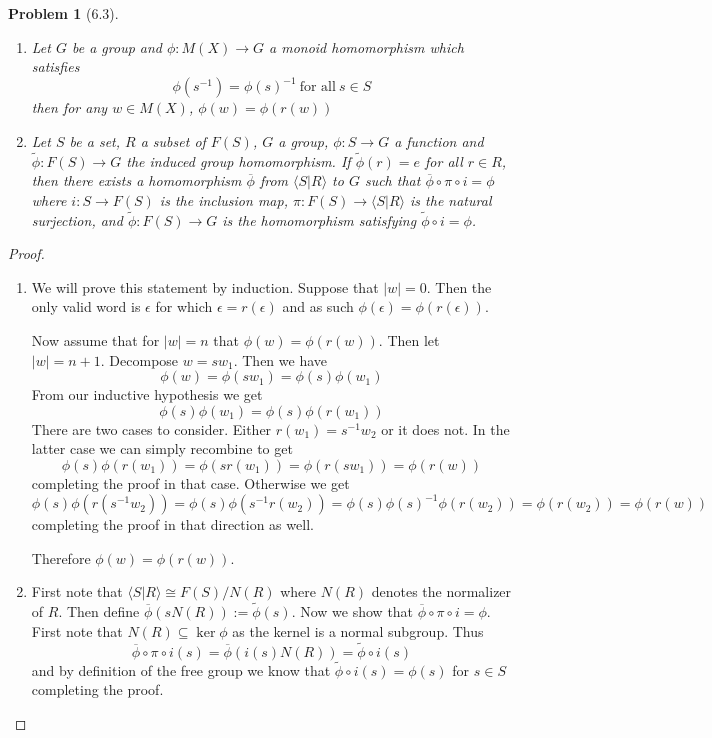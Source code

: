 \documentclass[10pt]{article}
\theoremstyle{plain}
\newtheorem{problem}{Problem}
\theoremstyle{remark}
\begin{document}
\begin{problem}[6.3]
  \begin{enumerate}
  \item Let $G$ be a group and $\phi:M(X)\rightarrow G$ a monoid homomorphism which
    satisfies
    \[ \phi(s^{-1})=\phi(s)^{-1}\ \text{for all}\ s\in S \]
    then for any $w\in M(X)$, $\phi(w)=\phi(r(w))$
  \item Let $S$ be a set, $R$ a subset of $F(S)$, $G$ a group, $\phi:S\rightarrow G$
    a function and $\widetilde{\phi}:F(S)\rightarrow G$ the induced group homomorphism.
    If $\widetilde{\phi}(r)=e$ for all $r\in R$, then there exists a homomorphism
    $\overline{\phi}$ from $\langle S|R\rangle$ to $G$ such that $\overline{\phi}\circ\pi\circ i = \phi$ where
    $i:S\rightarrow F(S)$ is the inclusion map, $\pi:F(S)\rightarrow \langle S|R\rangle$ is the natural
    surjection, and $\widetilde{\phi}:F(S)\rightarrow G$ is the homomorphism
    satisfying $\widetilde{\phi}\circ i=\phi$.
  \end{enumerate}
\end{problem}

\begin{proof}
  \begin{enumerate}
  \item We will prove this statement by induction.
    Suppose that $|w|=0$. Then the only valid word is $\epsilon$ for which
    $\epsilon=r(\epsilon)$ and as such $\phi(\epsilon)=\phi(r(\epsilon))$.

    Now assume that for $|w|=n$ that $\phi(w)=\phi(r(w))$. Then let
    $|w|=n+1$. Decompose $w=sw_1$. Then we have
    \[ \phi(w)=\phi(sw_1)=\phi(s)\phi(w_1)\]
    From our inductive hypothesis we get
    \[ \phi(s)\phi(w_1)=\phi(s)\phi(r(w_1)) \]
    There are two cases to consider. Either $r(w_1)=s^{-1}w_2$ or it does not.
    In the latter case we can simply recombine to get
    \[ \phi(s)\phi(r(w_1))=\phi(sr(w_1))=\phi(r(sw_1))=\phi(r(w))\]
    completing the proof in that case. Otherwise we get
    \[ \phi(s)\phi(r(s^{-1}w_2))=\phi(s)\phi(s^{-1}r(w_2))=\phi(s)\phi(s)^{-1}\phi(r(w_2))=\phi(r(w_2))=\phi(r(w))\]
    completing the proof in that direction as well.

    Therefore $\phi(w)=\phi(r(w))$.
  \item First note that $\langle S|R\rangle\cong F(S)/N(R)$ where $N(R)$ denotes the normalizer
    of $R$. Then define $\overline{\phi}(sN(R)):=\tilde{\phi}(s)$. Now we show that
    $\overline{\phi}\circ\pi\circ i=\phi$. First note that $N(R)\subseteq \ker\phi$ as the kernel is a
    normal subgroup. Thus
    \[ \overline{\phi}\circ\pi\circ i(s)=\overline{\phi}(i(s)N(R))= \tilde{\phi}\circ i(s) \]
    and by definition of the free group we know that
    $\tilde{\phi}\circ i(s)=\phi(s)$ for $s\in S$
    completing the proof.
  \end{enumerate}
\end{proof}
\end{document}
